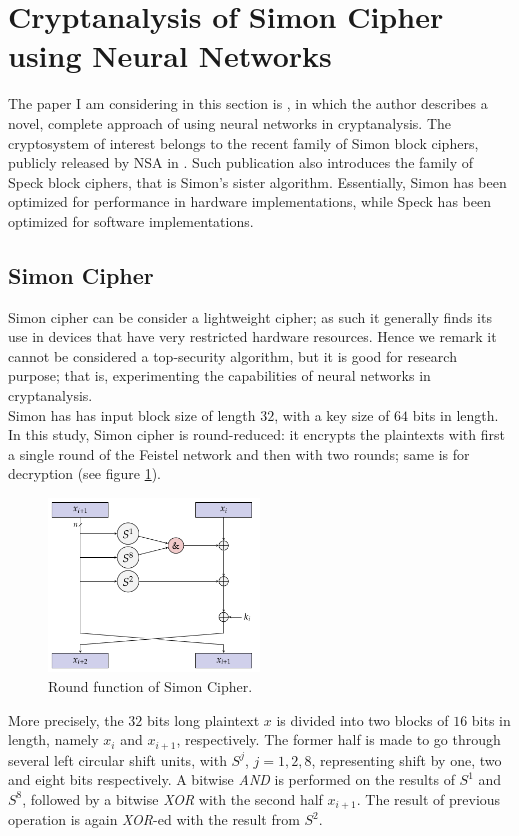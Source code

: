 \documentclass[%
    corpo=11pt,
    twoside,
    stile=classica,
    oldstyle,
    autoretitolo,
    tipotesi=magistrale,
    greek,
    evenboxes,
    english
]{toptesi}
\begin{document}
\section{Cryptanalysis of Simon Cipher using Neural Networks}
The paper I am considering in this section is \cite{jay}, in which the author describes a novel, complete approach of using neural networks in cryptanalysis. The cryptosystem of interest belongs to the recent family of Simon block ciphers, publicly released by NSA in \cite{nsa}. Such publication also introduces the family of Speck block ciphers, that is Simon's sister algorithm. Essentially, Simon has been optimized for performance in hardware implementations, while Speck has been optimized for software implementations.
\subsection{Simon Cipher}
Simon cipher can be consider a lightweight cipher; as such it generally finds its use in devices that have very restricted hardware resources. Hence we remark it cannot be considered a top-security algorithm, but it is good for research purpose; that is, experimenting the capabilities of neural networks in cryptanalysis. \\
Simon has has input block size of length $32$, with a key size of $64$ bits in length. In this study, Simon cipher is round-reduced: it encrypts the plaintexts with first a single round of the Feistel network and then with two rounds; same is for decryption (see figure \ref{fig:simon}).
\begin{figure}[h]
\centering
\includegraphics[width=0.5\textwidth]{pictures/simon.png}
\caption{Round function of Simon Cipher.}
\label{fig:simon}
\end{figure}
More precisely, the $32$ bits long plaintext $x$ is divided into two blocks of $16$ bits in length, namely $x_i$ and $x_{i+1}$, respectively. The former half is made to go through several left circular shift units, with $S^j$, $j = 1,2,8$, representing shift by one, two and eight bits respectively. A bitwise \textit{AND} is performed on the results of $S^1$ and $S^8$, followed by a bitwise \textit{XOR} with the second half $x_{i+1}$. The result of previous operation is again \textit{XOR}-ed with the result from $S^2$. \\
\end{document}
